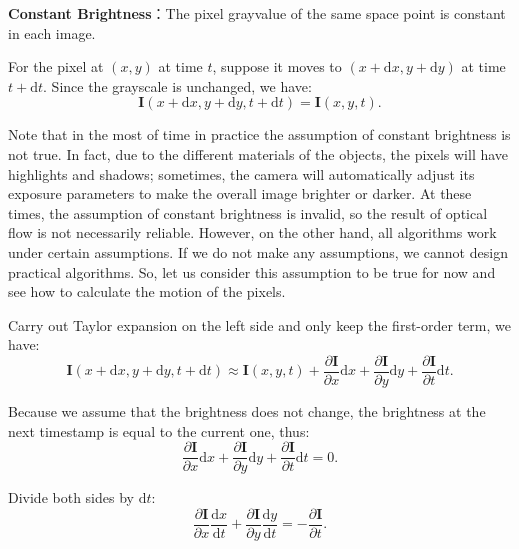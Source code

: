 \textbf{Constant Brightness}：The pixel grayvalue of the same space point is constant in each image.

For the pixel at $(x,y)$ at time $t$, suppose it moves to $(x+\mathrm{d}x, y+\mathrm{d}y)$ at time $t+\mathrm{d}t$. Since the grayscale is unchanged, we have:
\begin{equation} 
\mathbf{I}(x+\mathrm{d}x, y+\mathrm{d}y, t+\mathrm{d}t) = \mathbf{I} (x,y,t).
\end{equation}

Note that in the most of time in practice the assumption of constant brightness is not true. In fact, due to the different materials of the objects, the pixels will have highlights and shadows; sometimes, the camera will automatically adjust its exposure parameters to make the overall image brighter or darker. At these times, the assumption of constant brightness is invalid, so the result of optical flow is not necessarily reliable. However, on the other hand, all algorithms work under certain assumptions. If we do not make any assumptions, we cannot design practical algorithms. So, let us consider this assumption to be true for now and see how to calculate the motion of the pixels.

Carry out Taylor expansion on the left side and only keep the first-order term, we have:
\begin{equation}
\mathbf{I} \left( {x + \mathrm{d}x,y + \mathrm{d}y,t + \mathrm{d}t} \right) \approx \mathbf{I} \left( {x,y,t} \right) + \frac{{\partial \mathbf{I} }}{{\partial x}}\mathrm{d}x + \frac{{\partial \mathbf{I}}}{{\partial y}}\mathrm{d}y + \frac{{\partial \mathbf{I}}}{{\partial t}}\mathrm{d}t.
\end{equation}

Because we assume that the brightness does not change, the brightness at the next timestamp is equal to the current one, thus:
\begin{equation}
 \frac{{\partial \mathbf{I} }}{{\partial x}}\mathrm{d}x + \frac{{\partial \mathbf{I}}}{{\partial y}}\mathrm{d}y + \frac{{\partial \mathbf{I}}}{{\partial t}}\mathrm{d}t = 0.
\end{equation}

Divide both sides by $\mathrm{d}t$:
\begin{equation}\label{key}
 \frac{{\partial \mathbf{I} }}{{\partial x}} \frac{\mathrm{d}x}{\mathrm{d}t} + \frac{{\partial \mathbf{I}}}{{\partial y}} \frac{\mathrm{d}y}{\mathrm{d}t} =- \frac{{\partial \mathbf{I}}}{{\partial t}}.
\end{equation}

